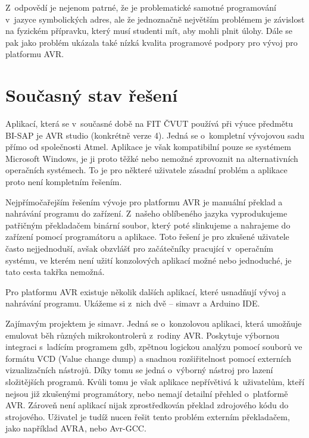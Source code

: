 Z~odpovědí je nejenom patrné, že je problematické samotné programování v~jazyce symbolických adres, ale že jednoznačně největším problémem je zá\-vis\-lost na fyzickém přípravku, který musí studenti mít, aby mohli plnit úlohy. Dále se pak jako problém ukázala také nízká kvalita programové podpory pro vývoj pro platformu AVR.

\section{Současný stav řešení}

Aplikací, která se v~současné době na FIT ČVUT používá při výuce předmětu BI-SAP je AVR studio (konkrétně verze 4)\cite{sap-avr-studio}. Jedná se o~kompletní vývojovou sadu přímo od společnosti Atmel\footnotemark. Aplikace je však kompatibilní pouze se systémem Microsoft Windows\cite{avr-studio-requirements}, je ji proto těžké nebo nemožné zprovoznit na alternativních operačních systémech. To je pro některé uživatele zásadní problém a aplikace proto není kompletním řešením.


Nejpřímočařejším řešením vývoje pro platformu AVR je manuální překlad a nahrávání programu do zařízení. Z~našeho oblíbeného jazyka vyprodukujeme patřičným překladačem binární soubor, který poté slinkujeme a nahrajeme do zařízení pomocí programátoru a aplikace. Toto řešení je pro zkušené uživatele často nejjednoduší, avšak obzvlášť pro začátečníky pracující v~operačním systému, ve kterém není užití konzolových aplikací možné nebo jednoduché, je tato cesta takřka nemožná.

Pro platformu AVR existuje několik dalších aplikací, které usnadňují vývoj a nahrávání programu. Ukážeme si z~nich dvě -- simavr\cite{github-simavr} a Arduino IDE\cite{arduino-ide}.


Zajímavým projektem je simavr\cite{github-simavr}. Jedná se o~konzolovou aplikaci, která umožňuje emulovat běh různých mikrokontrolerů z~rodiny AVR. Poskytuje výbornou integraci s~ladícím programem gdb, zpětnou logickou analýzu pomocí souborů ve formátu VCD (Value change dump) a snadnou rozšiřitelnost pomocí externích vizualizačních ná\-stro\-jů. Díky tomu se jedná o~výborný ná\-stroj pro lazení složitějších programů. Kvůli tomu je však aplikace nepřívětivá k~uživatelům, kteří nejsou již zkušenými programátory, nebo nemají detailní přehled o~platformě AVR. Zároveň není aplikací nijak zprostředkován překlad zdrojového kódu do strojového. Uživatel je tudíž nucen řešit tento problém externím překladačem, jako například AVRA\cite{avra-homepage}, nebo Avr-GCC\cite{avr-gcc}.


